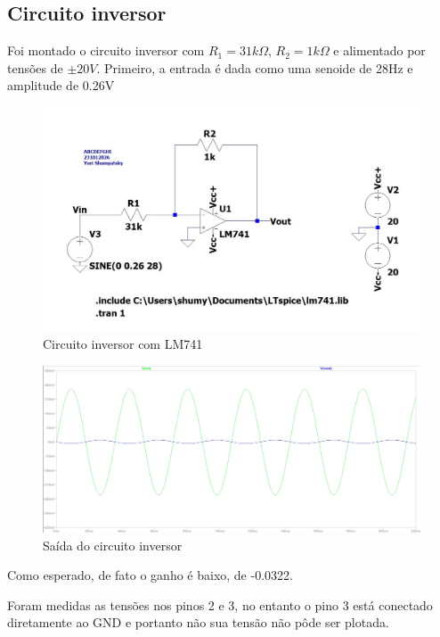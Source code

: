 \documentclass[10pt,twocolumn,letterpaper]{article}
\begin{document}
\subsection{Circuito inversor}

Foi montado o circuito inversor com $R_1=31k\Omega$, $R_2=1k\Omega$ e alimentado por tensões de $\pm20V$. Primeiro, a entrada é dada como uma senoide de 28Hz e amplitude de 0.26V

\begin{figure}[h]
\caption{Circuito inversor com LM741}
\begin{center}
\includegraphics[scale=0.15]{figuras/fig2}
\end{center}
\end{figure}
\newpage

\begin{figure}[h]
\caption{Saída do circuito inversor}
\begin{center}
\includegraphics[scale=0.15]{figuras/fig3}
\end{center}
\end{figure}

Como esperado, de fato o ganho é baixo, de -0.0322.

Foram medidas as tensões nos pinos 2 e 3, no entanto o pino 3 está conectado diretamente ao GND e portanto não sua tensão não pôde ser plotada. 
\end{document}
